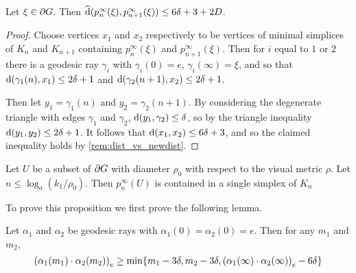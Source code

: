 \documentclass[a4paper]{article}
\begin{document}
\begin{lemma}\label{lem:close_projections}
  Let $\xi \in \boundary G$. Then $\newdist(p^\infty_n(\xi),
  p^\infty_{n+1}(\xi)) \leq 6\delta+3 + 2D$.
\end{lemma}

\begin{proof}
  Choose vertices $x_1$ and $x_2$ respectively to be vertices of minimal
  simplices of $K_n$ and $K_{n+1}$ containing $p^\infty_n(\xi)$ and
  $p^\infty_{n+1}(\xi)$. Then for $i$ equal to $1$ or $2$ there is a geodesic
  ray $\gamma_i$ with $\gamma_i(0) = e$, $\gamma_i(\infty) = \xi$, and so that
  $\dist(\gamma_1(n), x_1) \leq 2\delta+1$ and $\dist(\gamma_2(n+1),
  x_2) \leq 2\delta+1$.

  Then let $y_1 = \gamma_1(n)$ and $y_2 = \gamma_2(n+1)$. By considering the
  degenerate triangle with edges $\gamma_1$ and $\gamma_2$,
  $\dist(y_1, \gamma_2) \leq \delta$, so by the triangle inequality
  $\dist(y_1, y_2) \leq 2\delta +1$. It follows that $\dist(x_1, x_2)
  \leq 6\delta+3$, and so the claimed inequality holds by
  \cref{rem:dist_vs_newdist}.
\end{proof}

\begin{proposition}\label{prop:projectstoasimplex}
  Let $U$ be a subset of $\boundary G$ with diameter $\rho_0$ with respect to
  the visual metric $\rho$. Let $n \leq \log_a(k_1/\rho_0)$. Then
  $p^\infty_n(U)$ is contained in a single simplex of $K_n$
\end{proposition}

To prove this proposition we first prove the following lemma.

\begin{lemma}\label{lem:boundary_gromov_product}
  Let $\alpha_1$ and $\alpha_2$ be geodesic rays with $\alpha_1(0) =
  \alpha_2(0) = e$. Then for any $m_1$ and $m_2$,
  \begin{equation*}
    \gromov{e}{\alpha_1(m_1)}{\alpha_2(m_2)} \geq 
        \min\{m_1 - 3\delta, m_2 - 3\delta, \gromov{e}{\alpha_1(\infty)}{\alpha_2(\infty)} - 6\delta\}
  \end{equation*}
\end{lemma}
\end{document}
